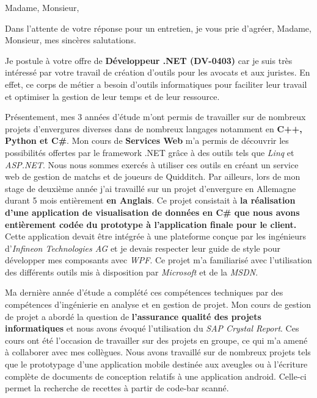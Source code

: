 \date{\today}
\opening{Madame, Monsieur,}
\closing{Dans l'attente de votre réponse pour un entretien, je vous prie d'agréer, Madame, Monsieur, mes sincères salutations.}

\makelettertitle

\introduction{}
Je postule à votre offre de \textbf{Développeur .NET (DV-0403)} car je suis très intéressé par votre travail de création d'outils pour les avocats et aux juristes. En effet, ce corps de métier a besoin d'outils informatiques pour faciliter leur travail et optimiser la gestion de leur temps et de leur ressource.

Présentement, mes 3 années d'étude m'ont permis de travailler sur de nombreux projets d'envergures diverses dans de nombreux langages notamment en \textbf{C++, Python et C\#}. Mon cours de \textbf{Services Web} m'a permis de découvrir les possibilités offertes par le framework .NET grâce à des outils tels que \textit{Linq} et \textit{ASP.NET}. Nous nous sommes exercés à utiliser ces outils en créant un service web de gestion de matchs et de joueurs de Quidditch. Par ailleurs, lors de mon stage de deuxième année j'ai travaillé sur un projet d'envergure en Allemagne durant 5 mois entièrement \textbf{en Anglais}. Ce projet consistait à \textbf{la réalisation d'une application de visualisation de données en C\# que nous avons entièrement codée du prototype à l'application finale pour le client.} Cette application devait être intégrée à une plateforme conçue par les ingénieurs d'\textit{Infineon Technologies AG} et je devais respecter leur guide de style pour développer mes composants avec \textit{WPF}. Ce projet m'a familiarisé avec l'utilisation des différents outils mis à disposition par \textit{Microsoft} et de la \textit{MSDN}.

Ma dernière année d'étude a complété ces compétences techniques par des compétences d'ingénierie en analyse et en gestion de projet. Mon cours de gestion de projet a abordé la question de \textbf{l'assurance qualité des projets informatiques} et nous avons évoqué l'utilisation du \textit{SAP Crystal Report}. Ces cours ont été l'occasion de travailler sur des projets en groupe, ce qui m'a amené à collaborer avec mes collègues. Nous avons travaillé sur de nombreux projets tels que le prototypage d'une application mobile destinée aux aveugles ou à l'écriture complète de documents de conception relatifs à une application android. Celle-ci permet la recherche de recettes à partir de code-bar scanné. \conclude{}

\makeletterclosing

